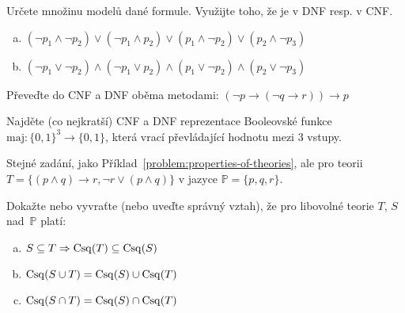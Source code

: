 \documentclass[a4paper,11pt]{amsart}
\begin{document}
\begin{problem} 
        
    Určete množinu modelů dané formule. Využijte toho, že je v DNF resp. v CNF.
    \begin{enumerate}[(a)]
        \item $(\neg p_1 \wedge \neg p_2)\vee( \neg p_1 \wedge p_2)\vee( p_1 \wedge \neg p_2)\vee( p_2 \wedge \neg p_3)$
        \item $(\neg p_1 \vee \neg p_2)\wedge( \neg p_1 \vee p_2)\wedge( p_1 \vee \neg p_2)\wedge( p_2 \vee \neg p_3)$
    \end{enumerate}

\end{problem}


\begin{problem} 
    
    Převeďte do CNF a DNF oběma metodami: $(\neg p \to (\neg q \to r))\to p$
    
\end{problem}


\begin{problem} 
    
    Najděte (co nejkratší) CNF a DNF reprezentace Booleovské funkce $\mathrm{maj}\colon\{0,1\}^3\to \{0,1\}$, která vrací převládající hodnotu mezi 3 vstupy.

\end{problem}


\begin{problem}
    
    Stejné zadání, jako Příklad~\ref{problem:properties-of-theories}, ale pro teorii $T=\{(p\wedge q)\to r, \neg r\vee(p\wedge q)\}$ v jazyce $\mathbb P=\{p,q,r\}$.
    
\end{problem}


\begin{problem}
    
    Dokažte nebo vyvraťte (nebo uveďte správný vztah), že pro libovolné teorie $T$, $S$ nad~$\mathbb{P}$ platí:
    \begin{enumerate}[(a)]
        \item $S\subseteq T \Rightarrow \operatorname{Csq}(T) \subseteq \operatorname{Csq}(S)$
        \item $\operatorname{Csq}(S\cup T)=\operatorname{Csq}(S) \cup \operatorname{Csq}(T)$
        \item $\operatorname{Csq}(S\cap T)=\operatorname{Csq}(S) \cap \operatorname{Csq}(T)$
    \end{enumerate}

\end{problem}
\end{document}
